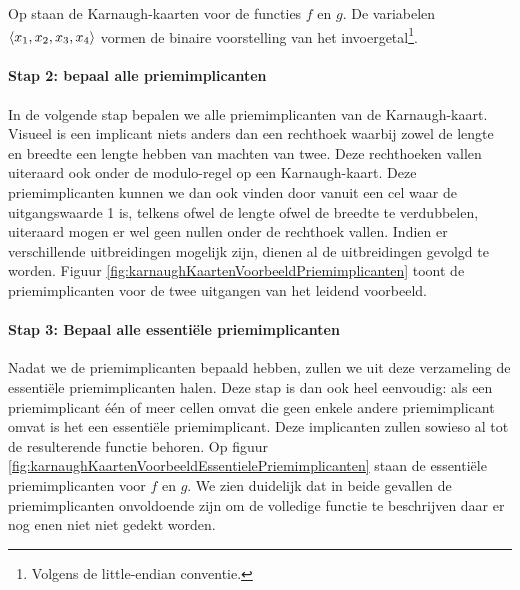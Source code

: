 
Op  staan de Karnaugh-kaarten voor de functies $f$ en $g$. De variabelen $\left\langle x_1,x_2,x_3,x_4 \right\rangle$ vormen de binaire voorstelling van het invoergetal\footnote{Volgens de little-endian conventie.}.

\paragraph{Stap 2: bepaal alle priemimplicanten}
In de volgende stap bepalen we alle priemimplicanten van de Karnaugh-kaart. Visueel is een implicant niets anders dan een rechthoek waarbij zowel de lengte en breedte een lengte hebben van machten van twee. Deze rechthoeken vallen uiteraard ook onder de modulo-regel op een Karnaugh-kaart. Deze priemimplicanten kunnen we dan ook vinden door vanuit een cel waar de uitgangswaarde 1 is, telkens ofwel de lengte ofwel de breedte te verdubbelen, uiteraard mogen er wel geen nullen onder de rechthoek vallen. Indien er verschillende uitbreidingen mogelijk zijn, dienen al de uitbreidingen gevolgd te worden. Figuur \ref{fig:karnaughKaartenVoorbeeldPriemimplicanten} toont de priemimplicanten voor de twee uitgangen van het leidend voorbeeld.


\paragraph{Stap 3: Bepaal alle essenti\"ele priemimplicanten}
Nadat we de priemimplicanten bepaald hebben, zullen we uit deze verzameling de essenti\"ele priemimplicanten halen. Deze stap is dan ook heel eenvoudig: als een priemimplicant \'e\'en of meer cellen omvat die geen enkele andere priemimplicant omvat is het een essenti\"ele priemimplicant. Deze implicanten zullen sowieso al tot de resulterende functie behoren. Op figuur \ref{fig:karnaughKaartenVoorbeeldEssentielePriemimplicanten} staan de essenti\"ele priemimplicanten voor $f$ en $g$. We zien duidelijk dat in beide gevallen de priemimplicanten onvoldoende zijn om de volledige functie te beschrijven daar er nog enen niet niet gedekt worden.
